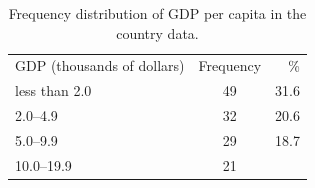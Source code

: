 \documentclass[11pt,a4paper,openany]{book}
\begin{document}
\begin{longtable}[]{@{}lcr@{}}
\caption{\label{tab:t-gdp} Frequency distribution of GDP per capita in the
country data.}\tabularnewline
\toprule
\begin{minipage}[t]{0.20\columnwidth}\raggedright\strut
GDP (thousands of dollars)\strut
\end{minipage} & \begin{minipage}[t]{0.15\columnwidth}\centering\strut
Frequency\strut
\end{minipage} & \begin{minipage}[t]{0.08\columnwidth}\raggedleft\strut
\%\strut
\end{minipage}\tabularnewline
\begin{minipage}[t]{0.20\columnwidth}\raggedright\strut
less than 2.0\strut
\end{minipage} & \begin{minipage}[t]{0.15\columnwidth}\centering\strut
49\strut
\end{minipage} & \begin{minipage}[t]{0.08\columnwidth}\raggedleft\strut
31.6\strut
\end{minipage}\tabularnewline
\begin{minipage}[t]{0.20\columnwidth}\raggedright\strut
2.0--4.9\strut
\end{minipage} & \begin{minipage}[t]{0.15\columnwidth}\centering\strut
32\strut
\end{minipage} & \begin{minipage}[t]{0.08\columnwidth}\raggedleft\strut
20.6\strut
\end{minipage}\tabularnewline
\begin{minipage}[t]{0.20\columnwidth}\raggedright\strut
5.0--9.9\strut
\end{minipage} & \begin{minipage}[t]{0.15\columnwidth}\centering\strut
29\strut
\end{minipage} & \begin{minipage}[t]{0.08\columnwidth}\raggedleft\strut
18.7\strut
\end{minipage}\tabularnewline
\begin{minipage}[t]{0.20\columnwidth}\raggedright\strut
10.0--19.9\strut
\end{minipage} & \begin{minipage}[t]{0.15\columnwidth}\centering\strut
21\strut
\end{minipage} & \begin{minipage}[t]{0.08\columnwidth}\raggedleft\strut

\end{minipage}
\end{longtable}
\end{document}
